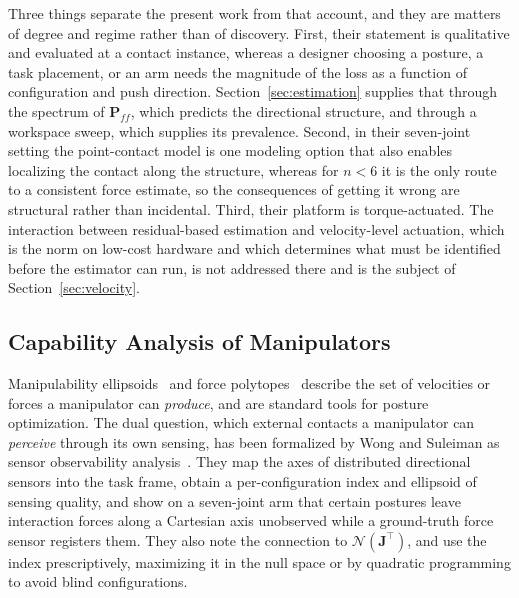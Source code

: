 \documentclass{ieeeaccess}
\newcommand{\Pff}{\bm{P}_{\!f\!f}}
\begin{document}
Three things separate the present work from that account, and they are matters of
degree and regime rather than of discovery. First, their statement is
qualitative and evaluated at a contact instance, whereas a designer choosing a
posture, a task placement, or an arm needs the magnitude of the loss as a function
of configuration and push direction. Section~\ref{sec:estimation} supplies that
through the spectrum of $\Pff$, which predicts the directional structure, and
through a workspace sweep, which supplies its prevalence. Second, in their
seven-joint setting the point-contact model is one modeling option that also
enables localizing the contact along the structure, whereas for $n<6$ it is the
only route to a consistent force estimate, so the consequences of getting it wrong
are structural rather than incidental. Third, their platform is torque-actuated.
The interaction between residual-based estimation and velocity-level actuation,
which is the norm on low-cost hardware and which determines what must be
identified before the estimator can run, is not addressed there and is the subject
of Section~\ref{sec:velocity}.

\subsection{Capability Analysis of Manipulators}
Manipulability ellipsoids~\cite{yoshikawa1985manipulability} and force
polytopes~\cite{chiacchio1997polytope} describe the set of velocities or forces a
manipulator can \emph{produce}, and are standard tools for posture optimization.
The dual question, which external contacts a manipulator can \emph{perceive}
through its own sensing, has been formalized by Wong and Suleiman as sensor
observability analysis~\cite{wong2024sensorobs}. They map the axes of distributed
directional sensors into the task frame, obtain a per-configuration index and
ellipsoid of sensing quality, and show on a seven-joint arm that certain postures
leave interaction forces along a Cartesian axis unobserved while a ground-truth
force sensor registers them. They also note the connection to
$\mathcal{N}(\bm J^{\!\top})$, and use the index prescriptively, maximizing it in
the null space or by quadratic programming to avoid blind configurations.
\end{document}

